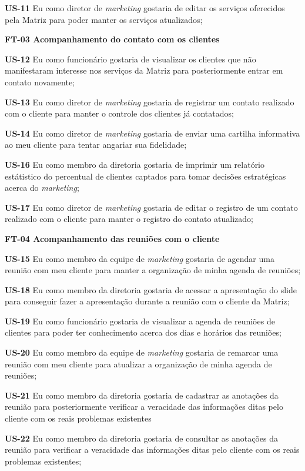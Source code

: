 \textbf{US-11} Eu como diretor de \textit{marketing} gostaria de editar os serviços oferecidos pela Matriz para poder manter os serviços atualizados;

\textbf{FT-03 Acompanhamento do contato com os clientes}

\textbf{US-12} Eu como funcionário gostaria de visualizar os clientes que não manifestaram interesse nos serviços da Matriz para posteriormente entrar em contato novamente;


\textbf{US-13} Eu como diretor de \textit{marketing} gostaria de registrar um contato realizado com o cliente para manter o controle dos clientes já contatados;


\textbf{US-14} Eu como diretor de \textit{marketing} gostaria de enviar uma cartilha informativa ao meu cliente para tentar angariar sua fidelidade;




\textbf{US-16} Eu como membro da diretoria gostaria de imprimir um relatório estátistico do percentual de clientes captados para tomar decisões estratégicas acerca do \textit{marketing};


\textbf{US-17} Eu como diretor de \textit{marketing} gostaria de editar o registro de um contato realizado com o cliente para manter o registro do contato atualizado;


\textbf{FT-04 Acompanhamento das reuniões com o cliente}

\textbf{US-15} Eu como membro da equipe de \textit{marketing} gostaria de agendar uma reunião com meu cliente para manter a organização de minha agenda de reuniões;


\textbf{US-18} Eu como membro da diretoria gostaria de acessar a apresentação do slide para conseguir fazer a apresentação durante a reunião com o cliente da Matriz;


\textbf{US-19} Eu como funcionário gostaria de visualizar a agenda de reuniões de clientes para poder ter conhecimento acerca dos dias e horários das reuniões;


\textbf{US-20} Eu como membro da equipe de \textit{marketing} gostaria de remarcar uma reunião com meu cliente para atualizar a organização de minha agenda de reuniões;


\textbf{US-21} Eu como membro da diretoria gostaria de cadastrar as anotações da reunião para posteriormente verificar a veracidade das informações ditas pelo cliente com os reais problemas existentes


\textbf{US-22} Eu como membro da diretoria gostaria de consultar as anotações da reunião para verificar a veracidade das informações ditas pelo cliente com os reais problemas existentes;


